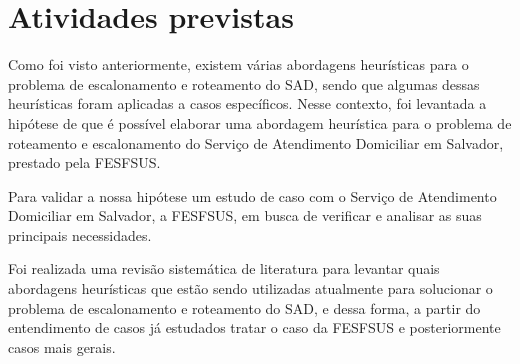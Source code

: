 


\section{Atividades previstas}
Como foi visto anteriormente, existem várias abordagens heurísticas para o problema de escalonamento e roteamento do \ac{SAD}, sendo que algumas dessas heurísticas foram aplicadas a casos específicos. Nesse contexto, foi levantada a hipótese de que é possível elaborar uma abordagem heurística para o problema de roteamento e escalonamento do Serviço de Atendimento Domiciliar em Salvador, prestado pela \ac{FESFSUS}.

Para validar a nossa hipótese um estudo de caso com o Serviço de Atendimento Domiciliar em Salvador, a \ac{FESFSUS}, em busca de verificar e analisar as suas principais necessidades.

Foi realizada uma revisão sistemática de literatura para levantar quais abordagens heurísticas que estão sendo utilizadas atualmente para solucionar o problema de escalonamento e roteamento do \ac{SAD}, e dessa forma, a partir do entendimento de casos já estudados tratar o caso da \ac{FESFSUS} e posteriormente casos mais gerais.

